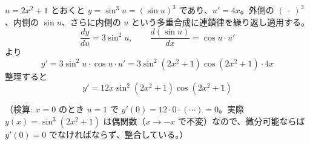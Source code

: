 
$u = 2x^{2}+1$ とおくと $y = \sin^{3}u = (\sin u)^{3}$ であり、$u' = 4x$。外側の $(\ \cdot\ )^{3}$、内側の $\sin u$、さらに内側の $u$ という多重合成に連鎖律を繰り返し適用する。
\[
\frac{dy}{du} = 3\sin^{2}u, \qquad \frac{d(\sin u)}{dx} = \cos u\cdot u'
\]
より
\[
y' = 3\sin^{2}u\cdot\cos u\cdot u' = 3\sin^{2}(2x^{2}+1)\cos(2x^{2}+1)\cdot 4x
\]
整理すると
\[
\boxed{\; y' = 12x\sin^{2}\!\left(2x^{2}+1\right)\cos\!\left(2x^{2}+1\right) \;}
\]

（検算: $x=0$ のとき $u=1$ で $y'(0) = 12\cdot 0\cdot(\cdots) = 0$。実際 $y(x) = \sin^{3}(2x^{2}+1)$ は偶関数（$x\to -x$ で不変）なので、微分可能ならば $y'(0)=0$ でなければならず、整合している。）
